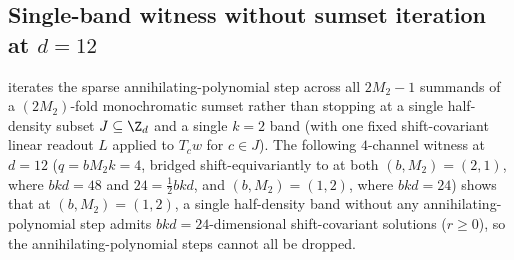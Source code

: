 \subsection{Single-band witness without sumset iteration at \texorpdfstring{$d = 12$}{d = 12}}\label{sec:d12-band}

 iterates the sparse annihilating-polynomial step across all $2M_2 - 1$ summands
of a $(2M_2)$-fold monochromatic sumset rather than stopping at a single half-density subset
$J \subseteq \Z_d$ and a single $k = 2$ band (with one fixed shift-covariant linear readout $L$
applied to $T_c w$ for $c \in J$). The following $4$-channel witness at $d = 12$ ($q = b M_2 k = 4$,
bridged shift-equivariantly to  at both $(b, M_2) = (2, 1)$,
where $bkd = 48$ and $24 = \frac{1}{2}bkd$, and $(b, M_2) = (1, 2)$, where $bkd = 24$) shows that at
$(b, M_2) = (1, 2)$, a single half-density band without any annihilating-polynomial step admits
$bkd = 24$-dimensional shift-covariant solutions ($r \ge 0$), so the annihilating-polynomial steps
cannot all be dropped.

